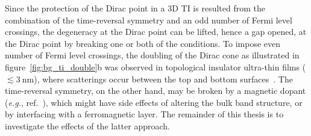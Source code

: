 Since the protection of the Dirac point in a 3D TI is resulted from the combination of the time-reversal symmetry and an odd number of Fermi level crossings, the degeneracy at the Dirac point can be lifted, hence a gap opened, at the Dirac point by breaking one or both of the conditions. To impose even number of Fermi level crossings, the doubling of the Dirac cone as illustrated in figure~\ref{fig:bg_ti_double}b was observed in topological insulator ultra-thin films ($\lesssim 3~\mathrm{nm}$), where scatterings occur between the top and bottom surfaces~\cite{ARPES_thickness}. The time-reversal symmetry, on the other hand, may be broken by a magnetic dopant (\textit{e.g.}, ref.~\cite{Chang2013}), which might have side effects of altering the bulk band structure, or by interfacing with a ferromagnetic layer. The remainder of this thesis is to investigate the effects of the latter approach.